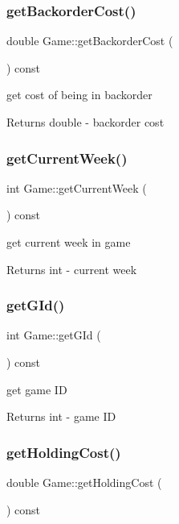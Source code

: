 \subsubsection{\texorpdfstring{get\+Backorder\+Cost()}{getBackorderCost()}}
{\footnotesize\ttfamily double Game\+::get\+Backorder\+Cost (\begin{DoxyParamCaption}{ }\end{DoxyParamCaption}) const}

get cost of being in backorder \begin{DoxyReturn}{Returns}
double -\/ backorder cost 
\end{DoxyReturn}
\mbox{\label{classGame_aa4d5959a4edb54d944b93c83725229aa}} 
\subsubsection{\texorpdfstring{get\+Current\+Week()}{getCurrentWeek()}}
{\footnotesize\ttfamily int Game\+::get\+Current\+Week (\begin{DoxyParamCaption}{ }\end{DoxyParamCaption}) const}

get current week in game \begin{DoxyReturn}{Returns}
int -\/ current week 
\end{DoxyReturn}
\mbox{\label{classGame_a13a42860435b979445a5e74b9ca4855a}} 
\subsubsection{\texorpdfstring{get\+G\+Id()}{getGId()}}
{\footnotesize\ttfamily int Game\+::get\+G\+Id (\begin{DoxyParamCaption}{ }\end{DoxyParamCaption}) const}

get game ID \begin{DoxyReturn}{Returns}
int -\/ game ID 
\end{DoxyReturn}
\mbox{\label{classGame_a0842aaa236062f2a9dd7e9d32f0be131}} 
\subsubsection{\texorpdfstring{get\+Holding\+Cost()}{getHoldingCost()}}
{\footnotesize\ttfamily double Game\+::get\+Holding\+Cost (\begin{DoxyParamCaption}{ }\end{DoxyParamCaption}) const}

